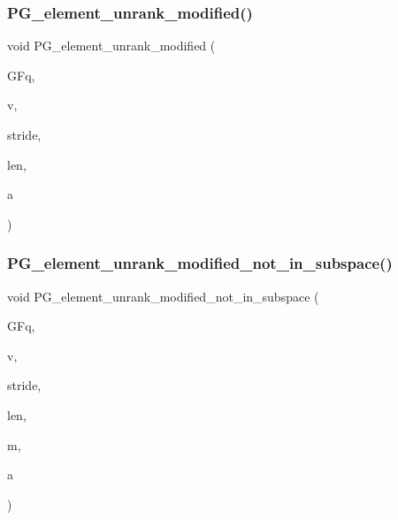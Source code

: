 \mbox{\label{projective_8_c_a83ae9b605d496f6a90345303f6efae64}} 
\subsubsection{\texorpdfstring{P\+G\+\_\+element\+\_\+unrank\+\_\+modified()}{PG\_element\_unrank\_modified()}}
{\footnotesize\ttfamily void P\+G\+\_\+element\+\_\+unrank\+\_\+modified (\begin{DoxyParamCaption}\item[{\mbox{\hyperlink{classfinite__field}{finite\+\_\+field}} \&}]{G\+Fq,  }\item[{\mbox{\hyperlink{galois_8h_a09fddde158a3a20bd2dcadb609de11dc}{I\+NT}} $\ast$}]{v,  }\item[{\mbox{\hyperlink{galois_8h_a09fddde158a3a20bd2dcadb609de11dc}{I\+NT}}}]{stride,  }\item[{\mbox{\hyperlink{galois_8h_a09fddde158a3a20bd2dcadb609de11dc}{I\+NT}}}]{len,  }\item[{\mbox{\hyperlink{galois_8h_a09fddde158a3a20bd2dcadb609de11dc}{I\+NT}}}]{a }\end{DoxyParamCaption})}

\mbox{\label{projective_8_c_a021a484e3d51e8934dabb47fe622f4e1}} 
\subsubsection{\texorpdfstring{P\+G\+\_\+element\+\_\+unrank\+\_\+modified\+\_\+not\+\_\+in\+\_\+subspace()}{PG\_element\_unrank\_modified\_not\_in\_subspace()}}
{\footnotesize\ttfamily void P\+G\+\_\+element\+\_\+unrank\+\_\+modified\+\_\+not\+\_\+in\+\_\+subspace (\begin{DoxyParamCaption}\item[{\mbox{\hyperlink{classfinite__field}{finite\+\_\+field}} \&}]{G\+Fq,  }\item[{\mbox{\hyperlink{galois_8h_a09fddde158a3a20bd2dcadb609de11dc}{I\+NT}} $\ast$}]{v,  }\item[{\mbox{\hyperlink{galois_8h_a09fddde158a3a20bd2dcadb609de11dc}{I\+NT}}}]{stride,  }\item[{\mbox{\hyperlink{galois_8h_a09fddde158a3a20bd2dcadb609de11dc}{I\+NT}}}]{len,  }\item[{\mbox{\hyperlink{galois_8h_a09fddde158a3a20bd2dcadb609de11dc}{I\+NT}}}]{m,  }\item[{\mbox{\hyperlink{galois_8h_a09fddde158a3a20bd2dcadb609de11dc}{I\+NT}}}]{a }\end{DoxyParamCaption})}

